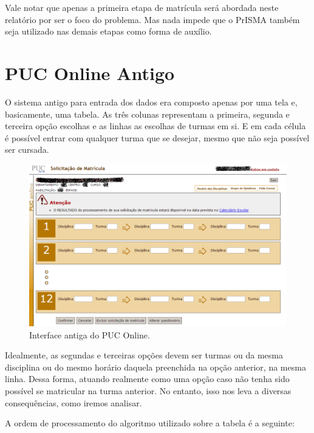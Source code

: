 \documentclass[graduacao,brazil]{ThesisPUC}
\begin{document}
Vale notar que apenas a primeira etapa de matrícula será abordada neste relatório por ser o foco do problema. Mas nada impede que o PrISMA também seja utilizado nas demais etapas como forma de auxílio.

\section{PUC Online Antigo}

O sistema antigo para entrada dos dados era composto apenas por uma tela e, basicamente, uma tabela. As três colunas representam a primeira, segunda e terceira opção escolhas e as linhas as escolhas de turmas em si. E em cada célula é possível entrar com qualquer turma que se desejar, mesmo que não seja possível ser cursada.

\begin{figure}[H]
    \centering
    \includegraphics[width=\linewidth]{img/puc_online_antigo.png}
    \caption{Interface antiga do PUC Online.}
\end{figure}

Idealmente, as segundas e terceiras opções devem ser turmas ou da mesma disciplina ou do mesmo horário daquela preenchida na opção anterior, na mesma linha. Dessa forma, atuando realmente como uma opção caso não tenha sido possível se matricular na turma anterior. No entanto, isso nos leva a diversas consequências, como iremos analisar.

A ordem de processamento do algoritmo utilizado sobre a tabela é a seguinte:
\end{document}
